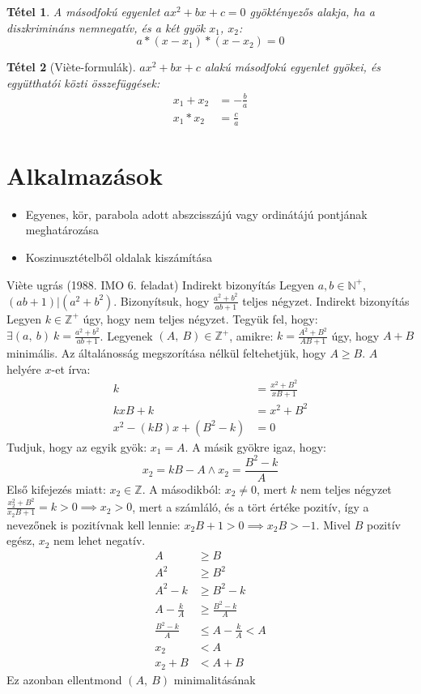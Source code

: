 \documentclass[twoside,12pt]{report}
\newtheorem{theorem}{Tétel}[section]
\theoremstyle{definition}
\begin{document}
	\begin{theorem}
		A másodfokú egyenlet $ax^2+bx+c=0$ gyöktényezős alakja, ha a diszkrimináns nemnegatív, és a két gyök $x_1$, $x_2$:
		\begin{equation*}
			a*(x-x_1)*(x-x_2)=0
		\end{equation*}
	\end{theorem}
	\begin{theorem}[Vi\`ete-formulák]
		$ax^2+bx+c$ alakú másodfokú egyenlet gyökei, és együtthatói közti összefüggések:
		\begin{align*}
			x_1+x_2&=-\frac{b}{a}\\
			x_1*x_2&=\frac{c}{a}
		\end{align*}
	\end{theorem}
\section{Alkalmazások}
	\begin{itemize}
		\item Egyenes, kör, parabola adott abszcisszájú vagy ordinátájú pontjának meghatározása
		\item Koszinusztételből oldalak kiszámítása
	\end{itemize}
	\begin{outline}
		\1 Vi\`ete ugrás (1988. IMO 6. feladat)
			\2  Indirekt bizonyítás
			\2 Legyen $a,b\in\mathbb{N}^+$, $(ab+1)|\left(a^2+b^2\right)$. Bizonyítsuk, hogy $\frac{a^2+b^2}{ab+1}$ teljes négyzet.
			\2 Indirekt bizonyítás
			\2 Legyen $k\in\mathbb{Z}^+$ úgy, hogy nem teljes négyzet. Tegyük fel, hogy: $\exists (a,\ b)\ k=\frac{a^2+b^2}{ab+1}$.
			\2 Legyenek $(A,\ B)\in\mathbb{Z}^+$, amikre: $k=\frac{A^2+B^2}{AB+1}$ úgy, hogy $A+B$ minimális. Az általánosság megszorítása nélkül feltehetjük, hogy $A\ge B$.
			\2 $A$ helyére $x$-et írva:
			\begin{align*}
				k&=\frac{x^2+B^2}{xB+1}\\
				kxB+k&=x^2+B^2\\
				x^2-(kB)x+(B^2-k)&=0
			\end{align*}
			\2 Tudjuk, hogy az egyik gyök: $x_1=A$. A másik gyökre igaz, hogy:
			\begin{equation*}
				x_2=kB-A\wedge x_2=\frac{B^2-k}{A}
			\end{equation*}
			\2 Első kifejezés miatt: $x_2\in\mathbb{Z}$. A másodikból: $x_2\ne0$, mert $k$ nem teljes négyzet
			\2 $\frac{x_2^2+B^2}{x_2B+1}=k>0\implies x_2>0$, mert a számláló, és a tört értéke pozitív, így a nevezőnek is pozitívnak kell lennie: $x_2B+1>0\implies x_2B>-1$. Mivel $B$ pozitív egész, $x_2$ nem lehet negatív.
			\2[] 
			\begin{align*}
				A&\ge B\tag{Mivel mindkét oldal pozitív}\\
				A^2&\ge B^2\\
				A^2-k&\ge B^2-k\tag{Mivel $A>0$}\\
				A-\frac{k}{A}&\ge \frac{B^2-k}{A}\\
				\frac{B^2-k}{A}&\le A-\frac{k}{A}<A\\
				x_2&<A\\
				x_2+B&<A+B
			\end{align*}
			\2 Ez azonban ellentmond $(A,\ B)$ minimalitásának
	\end{outline}
\end{document}
